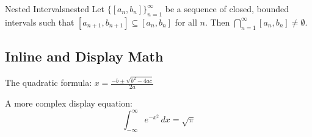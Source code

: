 \documentclass[11pt, a4paper]{article}
\begin{document}
\begin{lemma}{Nested Intervals}{nested}
  Let $\{[a_n, b_n]\}_{n=1}^{\infty}$ be a sequence of closed, bounded
  intervals such that $[a_{n+1}, b_{n+1}] \subseteq [a_n, b_n]$ for all $n$.
  Then $\bigcap_{n=1}^{\infty} [a_n, b_n] \neq \emptyset$.
\end{lemma}

\subsection{Inline and Display Math}

The quadratic formula: $x = \frac{-b \pm \sqrt{b^2 - 4ac}}{2a}$

A more complex display equation:
\[
  \int_{-\infty}^{\infty} e^{-x^2} \, dx = \sqrt{\pi}
\]
\end{document}
